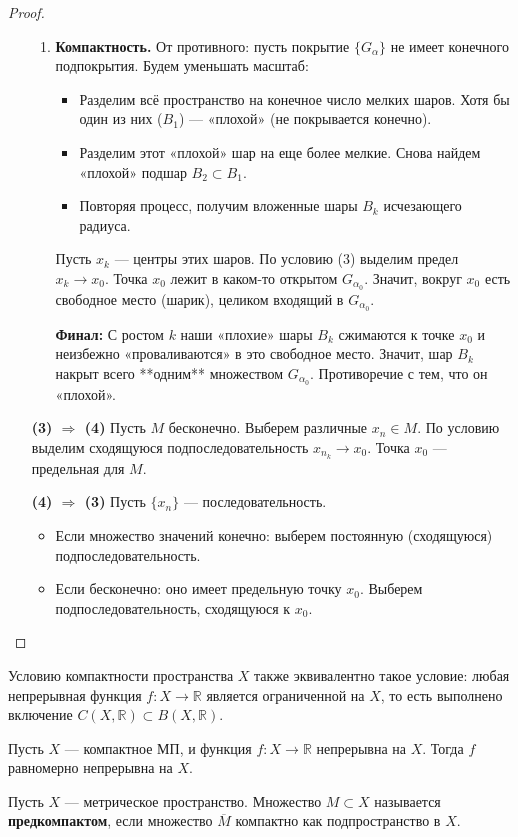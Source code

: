 \begin{proof}
\begin{itemize}
\begin{enumerate}
			\item \textbf{Компактность.} От противного: пусть покрытие $\{G_\alpha\}$ не имеет конечного подпокрытия. 
			Будем уменьшать масштаб:
			\begin{itemize}
				\item Разделим всё пространство на конечное число мелких шаров. Хотя бы один из них ($B_1$) — «плохой» (не покрывается конечно).
				\item Разделим этот «плохой» шар на еще более мелкие. Снова найдем «плохой» подшар $B_2 \subset B_1$.
				\item Повторяя процесс, получим вложенные шары $B_k$ исчезающего радиуса.
			\end{itemize}
			Пусть $x_k$ — центры этих шаров. По условию (3) выделим предел $x_k \to x_0$.
			Точка $x_0$ лежит в каком-то открытом $G_{\alpha_0}$. Значит, вокруг $x_0$ есть свободное место (шарик), целиком входящий в $G_{\alpha_0}$.
			
			\textbf{Финал:} С ростом $k$ наши «плохие» шары $B_k$ сжимаются к точке $x_0$ и неизбежно «проваливаются» в это свободное место. Значит, шар $B_k$ накрыт всего **одним** множеством $G_{\alpha_0}$. Противоречие с тем, что он «плохой».
		\end{enumerate}
		
		\item[\textbf{(3) $\Rightarrow$ (4)}] Пусть $M$ бесконечно. Выберем различные $x_n \in M$. По условию выделим сходящуюся подпоследовательность $x_{n_k} \to x_0$. Точка $x_0$ — предельная для $M$.
		
		\item[\textbf{(4) $\Rightarrow$ (3)}] Пусть $\{x_n\}$ — последовательность.
		\begin{itemize}
			\item Если множество значений конечно: выберем постоянную (сходящуюся) подпоследовательность.
			\item Если бесконечно: оно имеет предельную точку $x_0$. Выберем подпоследовательность, сходящуюся к $x_0$.
		\end{itemize}
	\end{itemize}
\end{proof}

\begin{remark}
	Условию компактности пространства $X$ также эквивалентно такое условие: любая непрерывная функция $f : X \to \mathbb{R}$ является ограниченной на $X$, то есть выполнено включение $C(X, \mathbb{R}) \subset B(X, \mathbb{R})$.
\end{remark}

\begin{theorem}[Кантора]\label{thm3.3}
	Пусть $X$ — компактное МП, и функция $f: X \to \mathbb{R}$ непрерывна на $X$. Тогда $f$ равномерно непрерывна на $X$.
\end{theorem}

\begin{definition}[Предкомпакт]
	Пусть $X$ — метрическое пространство. Множество $M \subset X$ называется \textbf{предкомпактом}, если множество $\overline M$ компактно как подпространство в $X$.
\end{definition}
